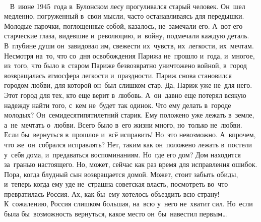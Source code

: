 
~

~
В~июне 1945~года в~Булонском лесу прогуливался старый человек.
Он~шел медленно, погруженный в~свои мысли, часто останавливаясь для передышки.
Молодые парочки, поглощенные собой, казалось, не~замечали его.
А~вот его старческие глаза, видевшие и~революцию, и~войну, подмечали каждую деталь.
В~глубине души он~завидовал им, свежести их~чувств, их~легкости, их~мечтам.
Несмотря на~то, что со~дня освобождения Парижа не~прошло и~года, и~многое, из~того, что было в~старом Париже безвозвратно уничтожено войной, в~город возвращалась атмосфера легкости и~праздности.
Париж снова становился городом любви, для которой он~был слишком стар.
Да, Париж уже не~для него.
Этот город для тех, кто еще верит в~любовь.
А~он~давно еще потерял всякую надежду найти того, с~кем не~будет так одинок.
Что ему делать в~городе молодых? Он~семидесятипятилетний старик.
Ему положено уже лежать в~земле, а~не~мечтать о~любви.
Всего было в~его жизни много, но~только не~любви.
Если бы~вернуться в~прошлое и~всё исправить! Но~это невозможно.
А~впрочем, что же~он~собрался исправлять? Нет, таким как он~положено лежать в~постели у~себя дома, и~предаваться воспоминаниям.
Но~где его дом? Дом находится за~гранью настоящего.
Но, может, сейчас как раз время для исправления ошибок.
Пора, когда блудный сын возвращается домой.
Может, стоит забыть обиды, и~теперь когда ему уде не~страшна советская власть, посмотреть во~что превратилась Россия.
Ах, как бы~ему хотелось объездить всю страну! К~сожалению, Россия слишком большая, на~всю у~него не~хватит сил.
Но~если была бы~возможность вернуться, какое место он~бы~навестил первым…
 
